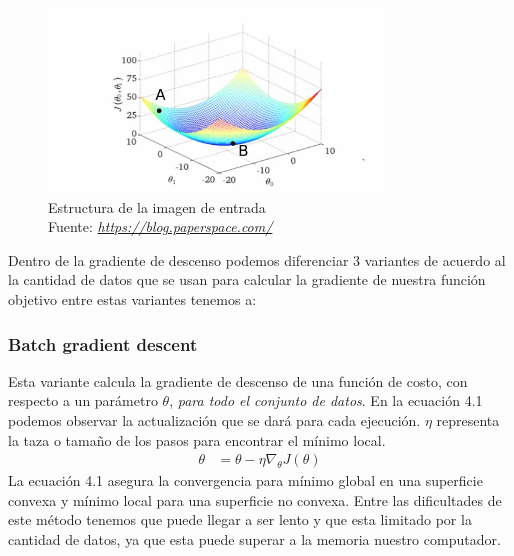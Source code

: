 \begin{figure}[H]
	\centering
	\includegraphics[width=0.8\textwidth]{Figures/gd.png}
	\caption{Estructura de la imagen de entrada \\ Fuente:  \href{https://blog.paperspace.com/intro-to-optimization-in-deep-learning-gradient-descent/}{\textit{https://blog.paperspace.com/}}}
	\label{image}
\end{figure} 

Dentro de la gradiente de descenso podemos diferenciar 3 variantes de acuerdo al la cantidad de datos que se usan para calcular la gradiente de nuestra función objetivo entre estas variantes tenemos a:\\

\subsubsection{Batch gradient descent}
Esta variante calcula la gradiente de descenso de una función de costo, con respecto a un parámetro $\theta$, \textit{para todo el conjunto de datos}. En la ecuación 4.1 podemos observar la actualización que se dará para cada ejecución. $\eta$ representa la taza o tamaño de los pasos para encontrar el mínimo local.
\begin{equation}
\label{bgds}
\begin{aligned}
\theta &= \theta - \eta \nabla_{\theta} J(\theta)
\end{aligned}
\end{equation}
La ecuación 4.1 asegura la convergencia para mínimo global en una superficie convexa y mínimo local para una superficie no convexa. Entre las dificultades de este método tenemos que puede llegar a ser lento y que esta limitado por la cantidad de datos, ya que esta puede superar a la memoria nuestro computador.	
